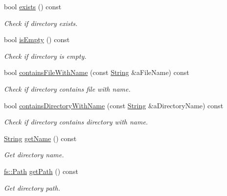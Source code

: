 \begin{DoxyCompactItemize}
bool \mbox{\hyperlink{classlibrary_1_1core_1_1fs_1_1_directory_a1625670c9b94125ee6965ba8bce848fd}{exists}} () const
\begin{DoxyCompactList}\small\item\em Check if directory exists. \end{DoxyCompactList}\item 
bool \mbox{\hyperlink{classlibrary_1_1core_1_1fs_1_1_directory_af664c462ccd42a31c670c0304597c74a}{is\+Empty}} () const
\begin{DoxyCompactList}\small\item\em Check if directory is empty. \end{DoxyCompactList}\item 
bool \mbox{\hyperlink{classlibrary_1_1core_1_1fs_1_1_directory_aa4e066fe1523c866fd1e7b7b82ad66f5}{contains\+File\+With\+Name}} (const \mbox{\hyperlink{classlibrary_1_1core_1_1types_1_1_string}{String}} \&a\+File\+Name) const
\begin{DoxyCompactList}\small\item\em Check if directory contains file with name. \end{DoxyCompactList}\item 
bool \mbox{\hyperlink{classlibrary_1_1core_1_1fs_1_1_directory_a8e669f2db69416126d2f7076bdf31e33}{contains\+Directory\+With\+Name}} (const \mbox{\hyperlink{classlibrary_1_1core_1_1types_1_1_string}{String}} \&a\+Directory\+Name) const
\begin{DoxyCompactList}\small\item\em Check if directory contains directory with name. \end{DoxyCompactList}\item 
\mbox{\hyperlink{classlibrary_1_1core_1_1types_1_1_string}{String}} \mbox{\hyperlink{classlibrary_1_1core_1_1fs_1_1_directory_a7c21b35bbdc6306d9b98cdd220515619}{get\+Name}} () const
\begin{DoxyCompactList}\small\item\em Get directory name. \end{DoxyCompactList}\item 
\mbox{\hyperlink{classlibrary_1_1core_1_1fs_1_1_path}{fs\+::\+Path}} \mbox{\hyperlink{classlibrary_1_1core_1_1fs_1_1_directory_a94b153cbebbcc5ac6db64ec3aee63901}{get\+Path}} () const
\begin{DoxyCompactList}\small\item\em Get directory path. \end{DoxyCompactList}\item 

\end{DoxyCompactItemize}
